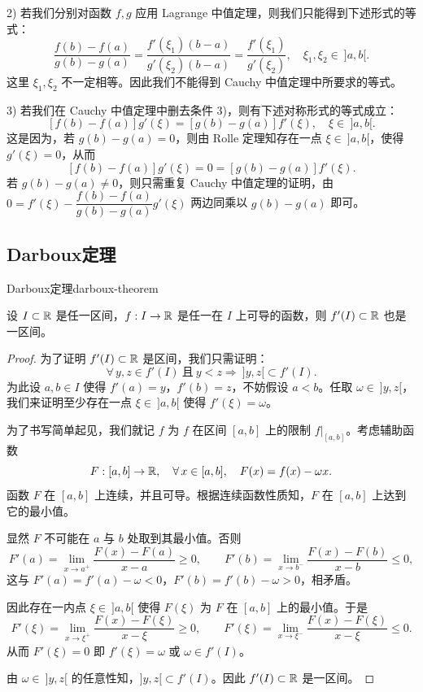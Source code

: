 2) 若我们分别对函数 \(f,g\) 应用 Lagrange 中值定理，则我们只能得到下述形式的等式：
\[
\frac{f(b)-f(a)}{g(b)-g(a)}=\frac{f'(\xi_1)(b-a)}{g'(\xi_2)(b-a)}=\frac{f'(\xi_1)}{g'(\xi_2)},\quad\xi_1,\xi_2\in\ ]a,b[.
\]
这里 \(\xi_1,\xi_2\) 不一定相等。因此我们不能得到 Cauchy 中值定理中所要求的等式。

3) 若我们在 Cauchy 中值定理中删去条件 3)，则有下述对称形式的等式成立：
\[
[f(b)-f(a)]g'(\xi)=[g(b)-g(a)]f'(\xi),\quad\xi\in\ ]a,b[.
\]
这是因为，若 \(g(b)-g(a)=0\)，则由 Rolle 定理知存在一点 \(\xi\in\ ]a,b[\)，使得 \(g'(\xi)=0\)，从而
\[
[f(b)-f(a)]g'(\xi)=0=[g(b)-g(a)]f'(\xi).
\]
若 \(g(b)-g(a)\neq0\)，则只需重复 Cauchy 中值定理的证明，由 \(0=f'(\xi)-\dfrac{f(b)-f(a)}{g(b)-g(a)}g'(\xi)\) 两边同乘以 \(g(b)-g(a)\) 即可。

\subsection{Darboux定理}
	\label{sec:6-3-4}

\begin{mythm}{Darboux定理}{darboux-theorem}

	设 \(I\subset\mathbb{R}\) 是任一区间，\(f:I\to\mathbb{R}\) 是任一在 \(I\) 上可导的函数，则 \(f'(I)\subset\mathbb{R}\) 也是一区间。

\end{mythm}

\begin{proof}

	为了证明 \(f'(I)\subset\mathbb{R}\) 是区间，我们只需证明：
	\[
	\forall\,y,z\in f'(I)\ \text{且}\ y<z\Longrightarrow\ ]y,z[\subset f'(I).
	\]
	为此设 \(a,b\in I\) 使得 \(f'(a)=y\)，\(f'(b)=z\)，不妨假设 \(a<b\)。任取 \(\omega\in\ ]y,z[\)，我们来证明至少存在一点 \(\xi\in\ ]a,b[\) 使得 \(f'(\xi)=\omega\)。

	为了书写简单起见，我们就记 \(f\) 为 \(f\) 在区间 \([a,b]\) 上的限制 \(f|_{[a,b]}\)。考虑辅助函数
	\[
	F:[a,b]\to\mathbb{R},\quad\forall\,x\in[a,b],\quad F(x)=f(x)-\omega x.
	\]
	函数 \(F\) 在 \([a,b]\) 上连续，并且可导。根据连续函数性质知，\(F\) 在 \([a,b]\) 上达到它的最小值。

	显然 \(F\) 不可能在 \(a\) 与 \(b\) 处取到其最小值。否则
	\[
	F'(a)=\lim_{x\to a^+}\frac{F(x)-F(a)}{x-a}\ge0,\qquad
	F'(b)=\lim_{x\to b^-}\frac{F(x)-F(b)}{x-b}\le0,
	\]
	这与 \(F'(a)=f'(a)-\omega<0\)，\(F'(b)=f'(b)-\omega>0\)，相矛盾。

	因此存在一内点 \(\xi\in\ ]a,b[\) 使得 \(F(\xi)\) 为 \(F\) 在 \([a,b]\) 上的最小值。于是
	\[
	F'(\xi)=\lim_{x\to\xi^+}\frac{F(x)-F(\xi)}{x-\xi}\ge0,\qquad
	F'(\xi)=\lim_{x\to\xi^-}\frac{F(x)-F(\xi)}{x-\xi}\le0.
	\]
	从而 \(F'(\xi)=0\) 即 \(f'(\xi)=\omega\) 或 \(\omega\in f'(I)\)。

	由 \(\omega\in\ ]y,z[\) 的任意性知，\(]y,z[\subset f'(I)\)。因此 \(f'(I)\subset\mathbb{R}\) 是一区间。

\end{proof}

